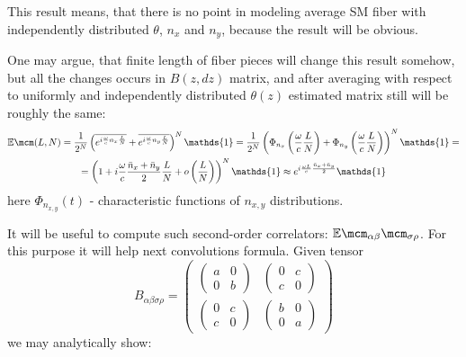 \documentclass[12pt, notitlepage]{report}
\begin{document}
\label{problem}
This result means, that there is no point in modeling average SM fiber with independently distributed $\theta$, $n_x$ and $n_y$, because the result will be obvious. 

One may argue, that finite length of fiber pieces will change this result somehow, but all the changes occurs in $B(z,dz)$ matrix, and after averaging with respect to uniformly and independently distributed $\theta(z)$ estimated matrix still will be roughly the same:
\begin{multline*}
	\mathbb{E}\mcm(L, N) = \dfrac{1}{2^N} \left( \overline{e^{i\frac{\omega}{c}n_x\frac{L}{N}}} + \overline{e^{i\frac{\omega}{c}n_y\frac{L}{N}}}\right)^N \mathds{1} = \dfrac{1}{2^N} \left( \Phi_{n_x}\left(\frac{\omega}{c}\frac{L}{N}\right) + \Phi_{n_y}\left(\frac{\omega}{c}\frac{L}{N}\right)\right)^N \mathds{1}= \\
	= \left( 1 + i\dfrac{\omega}{c}\dfrac{\bar{n}_x+\bar{n}_y}{2}\dfrac{L}{N} + o\left(\dfrac{L}{N}\right)\right)^N  \mathds{1} \approx e^{i\frac{\omega L}{c}\frac{\bar{n}_x + \bar{n}_y}{2}}\mathds{1}
\end{multline*}
here $\Phi_{n_{x,y}}(t)$ - characteristic functions of $n_{x,y}$ distributions.

It will be useful to compute such second-order correlators: $\mathbb{E}\mcm_{\alpha\beta}\mcm_{\sigma\rho}$. For this purpose it will help next convolutions formula. Given tensor
$$
B_{\alpha\beta\sigma\rho} = \begin{pmatrix}
	\begin{pmatrix}
		a & 0 \\
		0 & b
	\end{pmatrix} & 
	\begin{pmatrix}
		0 & c \\
		c & 0
	\end{pmatrix} \\
	\begin{pmatrix}
		0 & c \\
		c & 0
	\end{pmatrix} &
	\begin{pmatrix}
		b & 0 \\
		0 & a
	\end{pmatrix}
\end{pmatrix}
$$
we may analytically show:
\end{document}
